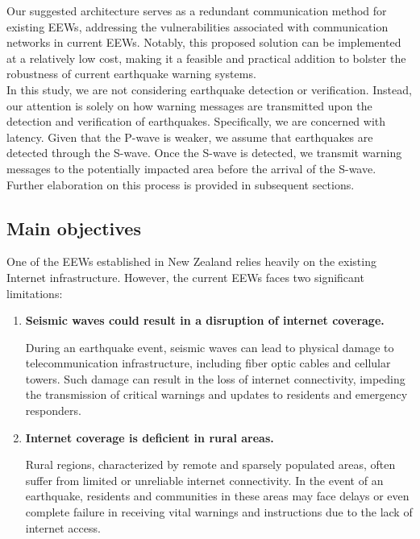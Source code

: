 Our suggested architecture serves as a redundant communication method for existing \ac{EEWs}, addressing the vulnerabilities associated with communication networks in current \ac{EEWs}. Notably, this proposed solution can be implemented at a relatively low cost, making it a feasible and practical addition to bolster the robustness of current earthquake warning systems.\\

In this study, we are not considering earthquake detection or verification. Instead, our attention is solely on how warning messages are transmitted upon the detection and verification of earthquakes. Specifically, we are concerned with latency. Given that the P-wave is weaker, we assume that earthquakes are detected through the S-wave. Once the S-wave is detected, we transmit warning messages to the potentially impacted area before the arrival of the S-wave. Further elaboration on this process is provided in subsequent sections.



\subsection{Main objectives}
\label{sec:Objectives}

\hspace{12pt} One of the \ac{EEWs} established in New Zealand relies heavily on the existing Internet infrastructure. However, the current \ac{EEWs} faces two significant limitations:

\begin{enumerate}
    \item \textbf{Seismic waves could result in a disruption of internet coverage.}   
    
    \hspace{12pt} During an earthquake event, seismic waves can lead to physical damage to telecommunication infrastructure, including fiber optic cables and cellular towers. Such damage can result in the loss of internet connectivity, impeding the transmission of critical warnings and updates to residents and emergency responders.
    
    \item \textbf{Internet coverage is deficient in rural areas.}  
    
    \hspace{12pt} Rural regions, characterized by remote and sparsely populated areas, often suffer from limited or unreliable internet connectivity. In the event of an earthquake, residents and communities in these areas may face delays or even complete failure in receiving vital warnings and instructions due to the lack of internet access.
\end{enumerate}

